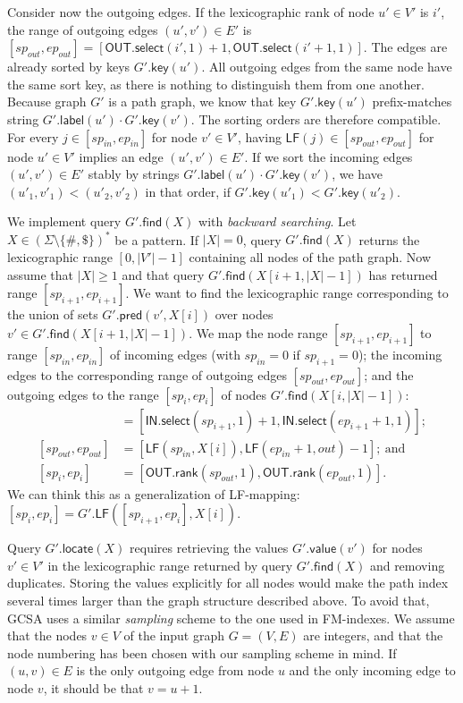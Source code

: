 \documentclass[a4paper,UKenglish]{lipics-v2016}
\newcommand{\set}[1]{\ensuremath{\{ #1 \}}}
\newcommand{\abs}[1]{\ensuremath{\lvert #1 \rvert}}
\newcommand{\rank}{\ensuremath{\mathsf{rank}}}
\newcommand{\select}{\ensuremath{\mathsf{select}}}
\newcommand{\LF}{\ensuremath{\mathsf{LF}}}
\newcommand{\find}{\ensuremath{\mathsf{find}}}
\newcommand{\locate}{\ensuremath{\mathsf{locate}}}
\newcommand{\glabel}{\ensuremath{\mathsf{label}}}
\newcommand{\gpred}{\ensuremath{\mathsf{pred}}}
\newcommand{\gkey}{\ensuremath{\mathsf{key}}}
\newcommand{\gvalue}{\ensuremath{\mathsf{value}}}
\newcommand{\LFmapping}{LF\nobreakdash-mapping}
\newcommand{\patternset}{\ensuremath{(\Sigma \setminus \set{\#, \$})^{\ast}}}
\newcommand{\bvIN}{\ensuremath{\mathsf{IN}}}
\newcommand{\bvOUT}{\ensuremath{\mathsf{OUT}}}
\begin{document}
Consider now the outgoing edges. If the lexicographic rank of node $u' \in V'$ is $i'$, the range of outgoing edges $(u', v') \in E'$ is $[sp_{out}, ep_{out}] = [\bvOUT.\select(i', 1) + 1, \bvOUT.\select(i'+1, 1)]$. The edges are already sorted by keys $G'.\gkey(u')$. All outgoing edges from the same node have the same sort key, as there is nothing to distinguish them from one another. Because graph $G'$ is a path graph, we know that key $G'.\gkey(u')$ prefix-matches string $G'.\glabel(u') \cdot G'.\gkey(v')$. The sorting orders are therefore compatible. For every $j \in [sp_{in}, ep_{in}]$ for node $v' \in V'$, having $\LF(j) \in [sp_{out}, ep_{out}]$ for node $u' \in V'$ implies an edge $(u', v') \in E'$. If we sort the incoming edges $(u', v') \in E'$ stably by strings $G'.\glabel(u') \cdot G'.\gkey(v')$, we have $(u'_{1}, v'_{1}) < (u'_{2}, v'_{2})$ in that order, if $G'.\gkey(u'_{1}) < G'.\gkey(u'_{2})$.

We implement query $G'.\find(X)$ with \emph{backward searching}. Let $X \in \patternset$ be a pattern. If $\abs{X} = 0$, query $G'.\find(X)$ returns the lexicographic range $[0, \abs{V'}-1]$ containing all nodes of the path graph. Now assume that $\abs{X} \ge 1$ and that query $G'.\find(X[i+1, \abs{X}-1])$ has returned range $[sp_{i+1}, ep_{i+1}]$. We want to find the lexicographic range corresponding to the union of sets $G'.\gpred(v', X[i])$ over nodes $v' \in G'.\find(X[i+1, \abs{X}-1])$. We map the node range $[sp_{i+1}, ep_{i+1}]$ to range $[sp_{in}, ep_{in}]$ of incoming edges (with $sp_{in} = 0$ if $sp_{i+1} = 0$); the incoming edges to the corresponding range of outgoing edges $[sp_{out}, ep_{out}]$; and the outgoing edges to the range $[sp_{i}, ep_{i}]$ of nodes $G'.\find(X[i, \abs{X}-1])$:
\begin{align*}
[sp_{in}, ep_{in}] & = [\bvIN.\select(sp_{i+1}, 1) + 1, \bvIN.\select(ep_{i+1}+1, 1)]; \\
[sp_{out}, ep_{out}] & = [\LF(sp_{in}, X[i]), \LF(ep_{in}+1, out) - 1];\ \textrm{and} \\
[sp_{i}, ep_{i}] & = [\bvOUT.\rank(sp_{out}, 1), \bvOUT.\rank(ep_{out}, 1)].
\end{align*}
We can think this as a generalization of \LFmapping: $[sp_{i}, ep_{i}] = G'.\LF([sp_{i+1}, ep_{i}], X[i])$.

Query $G'.\locate(X)$ requires retrieving the values $G'.\gvalue(v')$ for nodes $v' \in V'$ in the lexicographic range returned by query $G'.\find(X)$ and removing duplicates. Storing the values explicitly for all nodes would make the path index several times larger than the graph structure described above. To avoid that, GCSA uses a similar \emph{sampling} scheme to the one used in FM\nobreakdash-indexes. We assume that the nodes $v \in V$ of the input graph $G = (V, E)$ are integers, and that the node numbering has been chosen with our sampling scheme in mind. If $(u, v) \in E$ is the only outgoing edge from node $u$ and the only incoming edge to node $v$, it should be that $v = u+1$.
\end{document}
